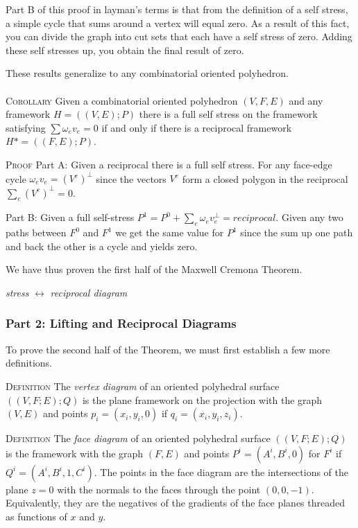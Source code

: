 \documentclass[11pt]{article}
\begin{document}
Part B of this proof in layman's terms is that from the definition of a self stress, a simple cycle that sums around a vertex will equal zero. As a result of this fact, you can divide the graph into cut sets that each have a self stress of zero. Adding these self stresses up, you obtain the final result of zero.

These results generalize to any combinatorial oriented polyhedron. \\
\\
\textsc{Corollary} Given a combinatorial oriented polyhedron $(V,F,E)$ and any framework $H = ((V,E);P)$ there is a full self stress on the framework satisfying $\sum \omega_ev_e = 0$ if and only if there is a reciprocal framework $H* = ((F,E);P)$. 

\textsc{Proof} Part A: Given a reciprocal there is a full self stress.
For any face-edge cycle $\omega_e v_e = (V^e)^{\bot}$ since the vectors $V^e$ form a closed polygon in the reciprocal $\sum_e(V^e)^\bot = 0$.

Part B: Given a full self-stress $P^1 = P^0 + \sum_e \omega_ev_e^\bot = reciprocal$.
Given any two paths between $F^0$ and $F^1$ we get the same value for $P^1$ since the sum up one path and back the other is a cycle and yields zero.

We have thus proven the first half of the Maxwell Cremona Theorem.

\emph{stress} $\leftrightarrow$ \emph{reciprocal diagram}

\subsubsection{Part 2: Lifting and Reciprocal Diagrams}
To prove the second half of the Theorem, we must first establish a few more definitions.

\textsc{Definition} The \emph{vertex diagram} of an oriented polyhedral surface $((V,F;E);Q)$ is the plane framework on the projection with the graph $(V,E)$ and points $p_i = (x_i,y_i,0)$ if $q_i = (x_i,y_i,z_i)$.


\textsc{Definition} The \emph{face diagram} of an oriented polyhedral surface $((V,F;E);Q)$ is the framework with the graph $(F,E)$ and points $P^i = (A^i,B^i,0)$ for $F^i$ if $Q^i = (A^i,B^i,1,C^i)$. The points in the face diagram are the intersections of the plane $z=0$ with the normals to the faces through the point $(0,0,-1)$. Equivalently, they are the negatives of the gradients of the face planes threaded as functions of $x$ and $y$.
 
\end{document}

